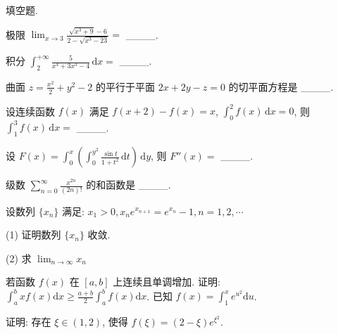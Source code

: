 \par{}
填空题.\par
极限  $\lim_{x\to3}\frac{\sqrt{x^{3}+9}-6}{2-\sqrt{x^{3}-23}}=$  \_\_\_\_.\par
积分 $\int_{2}^{+\infty} \frac{5}{x^4 + 3x^3 - 4} \, \mathrm{d}x =$ \_\_\_\_.\par
曲面 $z = \frac{x^2}{2} + y^2 - 2$ 的平行于平面 $2x + 2y - z = 0$ 的切平面方程是 \_\_\_\_.\par
设连续函数 $f(x)$ 满足 $f(x + 2) - f(x) = x$, $\int_0^2 f(x) \, \mathrm{d}x = 0$, 则 $\int_1^3 f(x) \, \mathrm{d}x =$ \_\_\_\_.\par
设 $F(x) = \int_{0}^{x} \left( \int_{0}^{y^2} \frac{\sin t}{1 + t^2} \, \mathrm{d}t \right) \, \mathrm{d}y$, 则 $F''(x) =$ \_\_\_\_.\par
级数  $\sum_{n=0}^{\infty}\frac{x^{2n}}{(2n)!}$  的和函数是 \_\_\_\_.\par
\par{}
设数列  $\{x_{n}\}$  满足:  $x_{1}>0, x_{n}e^{x_{n+1}}=e^{x_{n}}-1, n=1,2,\cdots$\par
(1) 证明数列 $\{x_{n}\}$ 收敛.\par
(2) 求 $\lim_{n\to \infty}x_n$\par
\par{}
若函数 $f(x)$ 在 $[a, b]$ 上连续且单调增加. 证明: $\int_{a}^{b} x f(x) \mathrm{d}x \geq \frac{a + b}{2} \int_{a}^{b} f(x) \mathrm{d}x$.
已知 $f(x) = \int_{1}^{x} e^{u^2} \mathrm{d}u$.\par
证明: 存在 $\xi \in (1,2)$, 使得 $f(\xi) = (2 - \xi)e^{\xi^2}$.\par
